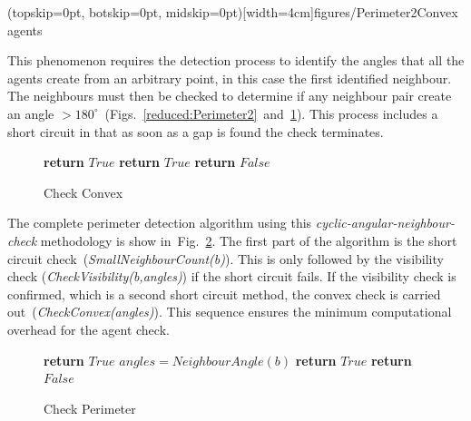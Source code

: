 \documentclass{ieeeaccess}
\begin{document}
\Figure[t!](topskip=0pt, botskip=0pt, midskip=0pt)[width=4cm]{figures/Perimeter2}{Convex agents\label{reduced:Perimeter2}}

This phenomenon requires the detection process to identify the angles that all the agents create from an arbitrary point, in this case the first identified neighbour. The neighbours must then be checked to determine if any neighbour pair create an angle $> 180^\circ$~(Figs.~\ref{reduced:Perimeter2}~and~\ref{algo:CheckConvex}). This process includes a short circuit in that as soon as a gap is found the check terminates. 

\begin{figure}
\begin{algorithmic}[1]
{}
\State\textbf{return} $True$
\EndIf
\EndIf
{}
\State\textbf{return} $True$
\EndIf
\EndFor
\State\textbf{return} $False$
\EndProcedure
\end{algorithmic}
\caption{Check Convex}
\label{algo:CheckConvex}
\end{figure}

The complete perimeter detection algorithm using this \textit{cyclic-angular-neighbour-check} methodology is show in~Fig.~\ref{algo:CheckPerimeter}. The first part of the algorithm is the short circuit check~(\textit{SmallNeighbourCount(b)}). This is only followed by the visibility check (\textit{CheckVisibility(b,angles)}) if the short circuit fails. If the visibility check is confirmed, which is a second short circuit method, the convex check is carried out~(\textit{CheckConvex(angles)}). This sequence ensures the minimum computational overhead for the agent check. 

\begin{figure}
\begin{algorithmic}[1]
{}
\State\textbf{return} $True$
\EndIf
\State$angles = NeighbourAngle(b)$
\State\textbf{return} $True$
\EndIf
\EndIf
\State\textbf{return} $False$
\EndProcedure
\end{algorithmic}
\caption{Check Perimeter}
\label{algo:CheckPerimeter}
\end{figure}
\end{document}
